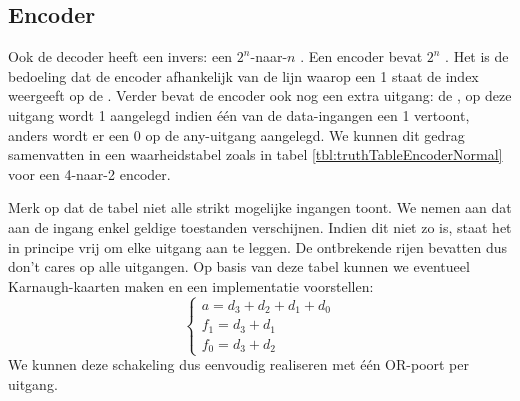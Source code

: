 \subsection{Encoder}
\label{ss:encoder}
Ook de decoder heeft een invers: een $2^n$-naar-$n$ . Een encoder bevat $2^n$ . Het is de bedoeling dat de encoder afhankelijk van de lijn waarop een 1 staat de index weergeeft op de . Verder bevat de encoder ook nog een extra uitgang: de , op deze uitgang wordt 1 aangelegd indien \'e\'en van de data-ingangen een 1 vertoont, anders wordt er een 0 op de any-uitgang aangelegd. We kunnen dit gedrag samenvatten in een waarheidstabel zoals in tabel \ref{tbl:truthTableEncoderNormal} voor een 4-naar-2 encoder.
\begin{table}[hbt]
\centering
{}
\caption{Waarheidtabellen van een encoder en prioriteitsencoder.}
\end{table}
Merk op dat de tabel niet alle strikt mogelijke ingangen toont. We nemen aan dat aan de ingang enkel geldige toestanden verschijnen. Indien dit niet zo is, staat het in principe vrij om elke uitgang aan te leggen. De ontbrekende rijen bevatten dus don't cares op alle uitgangen. Op basis van deze tabel kunnen we eventueel Karnaugh-kaarten maken en een implementatie voorstellen:
\begin{equation}
\left\{
\begin{array}{l}
a=d_3+d_2+d_1+d_0\\
f_1=d_3+d_1\\
f_0=d_3+d_2
\end{array}
\right.
\end{equation}
We kunnen deze schakeling dus eenvoudig realiseren met \'e\'en OR-poort per uitgang.
